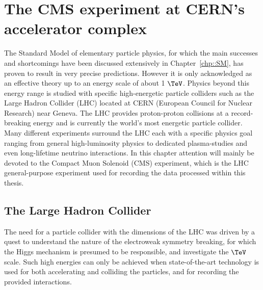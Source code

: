 \chapter{The CMS experiment at CERN's accelerator complex} \label{chp:CERN}

The Standard Model of elementary particle physics, for which the main successes and shortcomings have been discussed extensively in Chapter~\ref{chp::SM}, has proven to result in very precise predictions. However it is only acknowledged as an effective theory up to an energy scale of about 1 $\TeV$. Physics beyond this energy range is studied with specific high-energetic particle colliders such as the Large Hadron Collider (LHC) located at CERN (European Council for Nuclear Research) near Geneva. The LHC provides proton-proton collisions at a record-breaking energy and is currently the world's most energetic particle collider.\\
Many different experiments surround the LHC each with a specific physics goal ranging from general high-luminosity physics to dedicated plasma-studies and even long-lifetime neutrino interactions.
In this chapter attention will mainly be devoted to the Compact Muon Solenoid (CMS) experiment, which is the LHC general-purpose experiment used for recording the data processed within this thesis.

\section{The Large Hadron Collider}
The need for a particle collider with the dimensions of the LHC was driven by a quest to understand the nature of the electroweak symmetry breaking, for which the Higgs mechanism is presumed to be responsible, and investigate the $\TeV$ scale.
Such high energies can only be achieved when state-of-the-art technology is used for both accelerating and colliding the particles, and for recording the provided interactions.
\\

